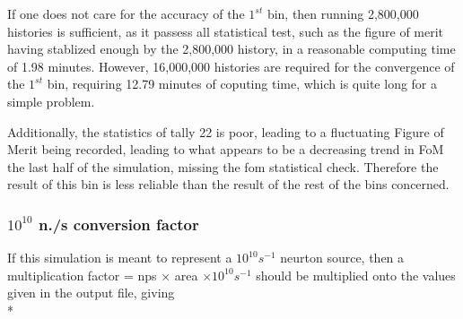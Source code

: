 \documentclass[a4paper, 12pt]{article}
\begin{document}
If one does not care for the accuracy of the $1^{st}$ bin, then running 2,800,000 histories is sufficient, as it passess all statistical test, such as the figure of merit having stablized enough by the 2,800,000 history, in a reasonable computing time of 1.98 minutes. However, 16,000,000 histories are required for the convergence of the $1^{st}$ bin, requiring 12.79 minutes of coputing time, which is quite long for a simple problem.

Additionally, the statistics of tally 22 is poor, leading to a fluctuating Figure of Merit being recorded, leading to what appears to be a decreasing trend in FoM the last half of the simulation, missing the fom statistical check. Therefore the result of this bin is less reliable than the result of the rest of the bins concerned.
\subsubsection{$10^{10}$ n./s conversion factor}
	If this simulation is meant to represent a $10^{10} s^{-1}$ neurton source, then a multiplication factor = nps $\times$ area $\times 10^{10} s^{-1}$ should be multiplied onto the values given in the output file, giving \\*
\end{document}
